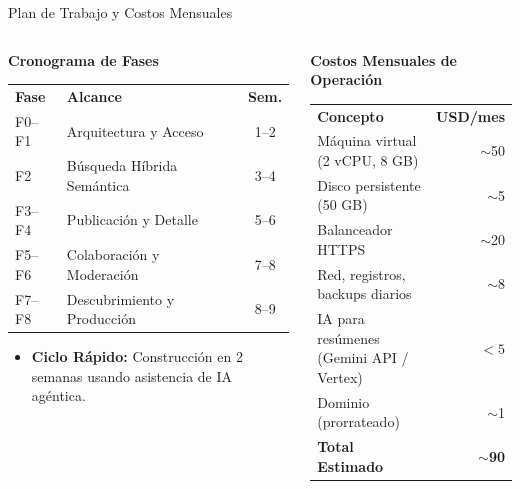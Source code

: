\documentclass[11pt,aspectratio=169]{beamer}
\newcommand{\thead}[1]{{\color{white}\bfseries #1}}
\begin{document}
\begin{frame}{Plan de Trabajo y Costos Mensuales}
  \begin{columns}[T]
    \begin{column}{0.48\textwidth}
      {\headingfont\small\bfseries\color{brandlt}Cronograma de Fases}\\[0.1cm]
      {\scriptsize
      \begin{tabularx}{\textwidth}{l L c}
        \thead{Fase} & \thead{Alcance} & \thead{Sem.} \\
        F0--F1 & Arquitectura y Acceso & 1--2 \\
        F2 & Búsqueda Híbrida Semántica & 3--4 \\
        F3--F4 & Publicación y Detalle & 5--6 \\
        F5--F6 & Colaboración y Moderación & 7--8 \\
        F7--F8 & Descubrimiento y Producción & 8--9 \\
        \bottomrule
      \end{tabularx}
      }
      \vspace{0.1cm}
      \begin{itemize}
        \item \scriptsize \textbf{Ciclo Rápido:} Construcción en 2 semanas usando asistencia de IA agéntica.
      \end{itemize}
    \end{column}

    \begin{column}{0.48\textwidth}
      {\headingfont\small\bfseries\color{brandlt}Costos Mensuales de Operación}\\[0.1cm]
      {\scriptsize
      \begin{tabularx}{\textwidth}{L r}
        \thead{Concepto} & \thead{USD/mes} \\
        Máquina virtual (2 vCPU, 8 GB) & $\sim$50 \\
        Disco persistente (50 GB) & $\sim$5 \\
        Balanceador HTTPS & $\sim$20 \\
        Red, registros, backups diarios & $\sim$8 \\
        IA para resúmenes (Gemini API / Vertex) & $<5$ \\
        Dominio (prorrateado) & $\sim$1 \\
        \midrule
        \textbf{Total Estimado} & \textbf{$\sim$90} \\
        \bottomrule
      \end{tabularx}
      }
    \end{column}
  \end{columns}
\end{frame}
\end{document}
